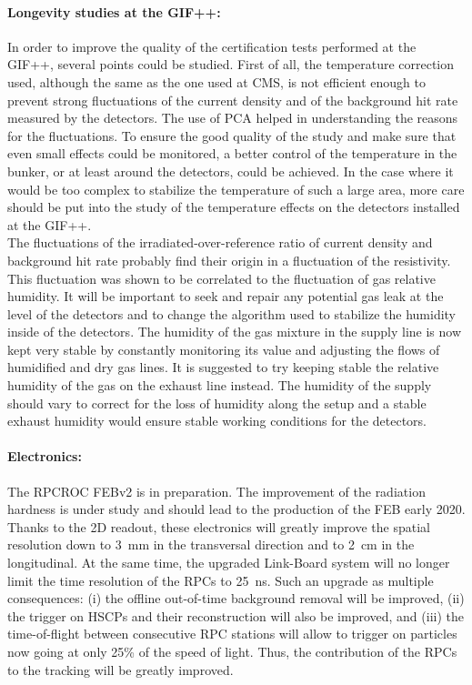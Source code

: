 	\paragraph*{Longevity studies at the GIF++:} In order to improve the quality of the certification tests performed at the GIF++, several points could be studied. First of all, the temperature correction used, although the same as the one used at CMS, is not efficient enough to prevent strong fluctuations of the current density and of the background hit rate measured by the detectors. The use of \acl{PCA} helped in understanding the reasons for the fluctuations. To ensure the good quality of the study and make sure that even small effects could be monitored, a better control of the temperature in the bunker, or at least around the detectors, could be achieved. In the case where it would be too complex to stabilize the temperature of such a large area, more care should be put into the study of the temperature effects on the detectors installed at the GIF++.\\
	The fluctuations of the irradiated-over-reference ratio of current density and background hit rate probably find their origin in a fluctuation of the resistivity. This fluctuation was shown to be correlated to the fluctuation of gas relative humidity. It will be important to seek and repair any potential gas leak at the level of the detectors and to change the algorithm used to stabilize the humidity inside of the detectors. The humidity of the gas mixture in the supply line is now kept very stable by constantly monitoring its value and adjusting the flows of humidified and dry gas lines. It is suggested to try keeping stable the relative humidity of the gas on the exhaust line instead. The humidity of the supply should vary to correct for the loss of humidity along the setup and a stable exhaust humidity would ensure stable working conditions for the detectors.
	
	\paragraph*{Electronics:} The RPCROC FEBv2 is in preparation. The improvement of the radiation hardness is under study and should lead to the production of the FEB early 2020. Thanks to the 2D readout, these electronics will greatly improve the spatial resolution down to \SI{3}{mm} in the transversal direction and to \SI{2}{cm} in the longitudinal. At the same time, the upgraded Link-Board system will no longer limit the time resolution of the RPCs to \SI{25}{ns}. Such an upgrade as multiple consequences: (i) the offline out-of-time background removal will be improved, (ii) the trigger on HSCPs and their reconstruction will also be improved, and (iii) the time-of-flight between consecutive RPC stations will allow to trigger on particles now going at only 25\% of the speed of light. Thus, the contribution of the RPCs to the tracking will be greatly improved.
	
